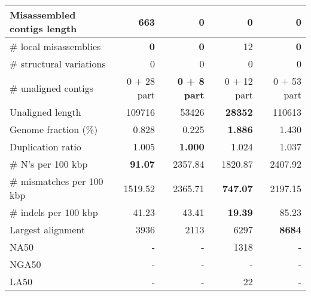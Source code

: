 \documentclass[12pt,a4paper]{article}
\begin{document}
\begin{table}[ht]
\begin{center}
\begin{tabular}{|l*{4}{|r}|}
Misassembled contigs length & 663 & {\bf 0} & {\bf 0} & {\bf 0} \\ \hline
\# local misassemblies & {\bf 0} & {\bf 0} & 12 & {\bf 0} \\ \hline
\# structural variations & 0 & 0 & 0 & 0 \\ \hline
\# unaligned contigs & 0 + 28 part & {\bf 0 + 8 part} & 0 + 12 part & 0 + 53 part \\ \hline
Unaligned length & 109716 & 53426 & {\bf 28352} & 110613 \\ \hline
Genome fraction (\%) & 0.828 & 0.225 & {\bf 1.886} & 1.430 \\ \hline
Duplication ratio & 1.005 & {\bf 1.000} & 1.024 & 1.037 \\ \hline
\# N's per 100 kbp & {\bf 91.07} & 2357.84 & 1820.87 & 2407.92 \\ \hline
\# mismatches per 100 kbp & 1519.52 & 2365.71 & {\bf 747.07} & 2197.15 \\ \hline
\# indels per 100 kbp & 41.23 & 43.41 & {\bf 19.39} & 85.23 \\ \hline
Largest alignment & 3936 & 2113 & 6297 & {\bf 8684} \\ \hline
NA50 & - & - & 1318 & - \\ \hline
NGA50 & - & - & - & - \\ \hline
LA50 & - & - & 22 & - \\ \hline
\end{tabular}
\end{center}
\end{table}
\end{document}
